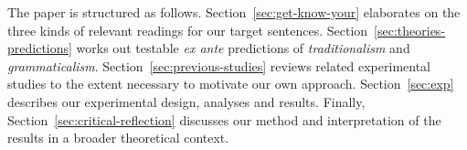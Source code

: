 \documentclass[fleqn,reqno,10pt]{article}
\renewcommand{\es}{\acro{es}}
\renewcommand{\mymark}[1]{\textbf{#1}}
\begin{document}


The paper is structured as follows. Section~\ref{sec:get-know-your}
elaborates on the three kinds of relevant readings for our target
sentences. Section~\ref{sec:theories-predictions} works out testable
\emph{ex ante} predictions of \emph{traditionalism} and
\emph{grammaticalism}. Section~\ref{sec:previous-studies} reviews
related experimental studies to the extent necessary to motivate our
own approach. Section~\ref{sec:exp} describes our experimental design,
analyses and results. Finally, Section~\ref{sec:critical-reflection}
discusses our method and interpretation of the results in a broader
theoretical context.
\end{document}
